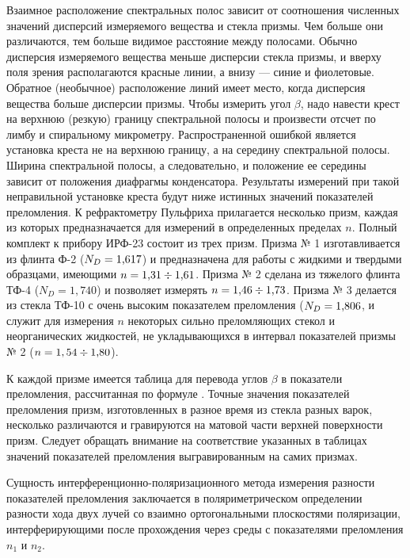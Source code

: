 Взаимное расположение спектральных полос зависит от соотношения
численных значений дисперсий измеряемого вещества и стекла призмы.
Чем больше они различаются, тем больше видимое расстояние между
полосами. Обычно дисперсия измеряемого вещества меньше дисперсии
стекла призмы, и вверху поля зрения располагаются красные линии, а
внизу --- синие и фиолетовые. Обратное (необычное) расположение
линий имеет место, когда дисперсия вещества больше дисперсии
призмы. Чтобы измерить угол $\beta$, надо навести крест на верхнюю
(резкую) границу спектральной полосы и произвести отсчет по лимбу
и спиральному микрометру. Распространенной ошибкой является
установка креста не на верхнюю границу, а на середину спектральной
полосы. Ширина спектральной полосы, а следовательно, и положение
ее середины зависит от положения диафрагмы конденсатора.
Результаты измерений при такой неправильной установке креста будут
ниже истинных значений показателей преломления. К рефрактометру
Пульфриха прилагается несколько призм, каждая из которых
предназначается для измерений в определенных пределах $n$. Полный
комплект к прибору ИРФ-23 состоит из трех призм. Призма № 1
изготавливается из флинта Ф-2 ($N_D=\hbox{1,617}$) и предназначена для
работы с жидкими и твердыми образцами, имеющими $n=\hbox{1,31}\div \hbox{1,61}$.
Призма № 2 сделана из тяжелого флинта ТФ-4 ($N_D=1,740$) и
позволяет измерять $n=\hbox{1,46}\div \hbox{1,73}$. Призма № 3 делается из
стекла ТФ-10 с очень высоким показателем преломления ($N_D=\hbox{1,806}$,
и служит для измерения $n$ некоторых сильно преломляющих стекол и
неорганических жидкостей, не укладывающихся в интервал показателей
призмы № 2 ($n=1,54\div \hbox{1,80}$).

К каждой призме имеется таблица для перевода углов $\beta$ в
показатели преломления, рассчитанная по формуле . Точные
значения показателей преломления призм, изготовленных в разное
время из стекла разных варок, несколько различаются и гравируются
на матовой части верхней поверхности призм. Следует обращать
внимание на соответствие указанных в таблицах значений показателей
преломления выгравированным на самих призмах.\pagebreak



Сущность
интерференционно-поляризационного метода измерения разности
показателей преломления заключается в поляриметрическом
определении разности хода двух лучей со взаимно ортогональными
плоскостями поляризации, интерферирующими после прохождения через
среды с показателями преломления $n_1$ и $n_2$.

